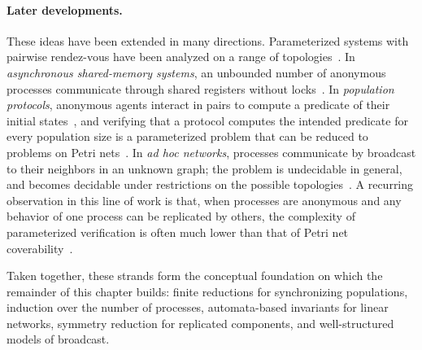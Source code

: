 \paragraph{Later developments.}
These ideas have been extended in many directions. Parameterized systems with
pairwise rendez-vous have been analyzed on a range of
topologies~\cite{AKRSV18}. In \emph{asynchronous shared-memory systems}, an
unbounded number of anonymous processes communicate through shared registers
without locks~\cite{EGM16}. In \emph{population protocols}, anonymous agents
interact in pairs to compute a predicate of their initial
states~\cite{AADFP06}, and verifying that a protocol computes the intended
predicate for every population size is a parameterized problem that can be
reduced to problems on Petri nets~\cite{EGLM17}. In \emph{ad hoc networks},
processes communicate by broadcast to their neighbors in an unknown graph; the
problem is undecidable in general, and becomes decidable under restrictions on
the possible topologies~\cite{DSZ10}. A recurring observation in this line of
work is that, when processes are anonymous and any behavior of one process can
be replicated by others, the complexity of parameterized verification is often
much lower than that of Petri net coverability~\cite{Esp14}.

Taken together, these strands form the conceptual foundation on which the
remainder of this chapter builds: finite reductions for synchronizing
populations, induction over the number of processes, automata-based
invariants for linear networks, symmetry reduction for replicated components,
and well-structured models of broadcast.
